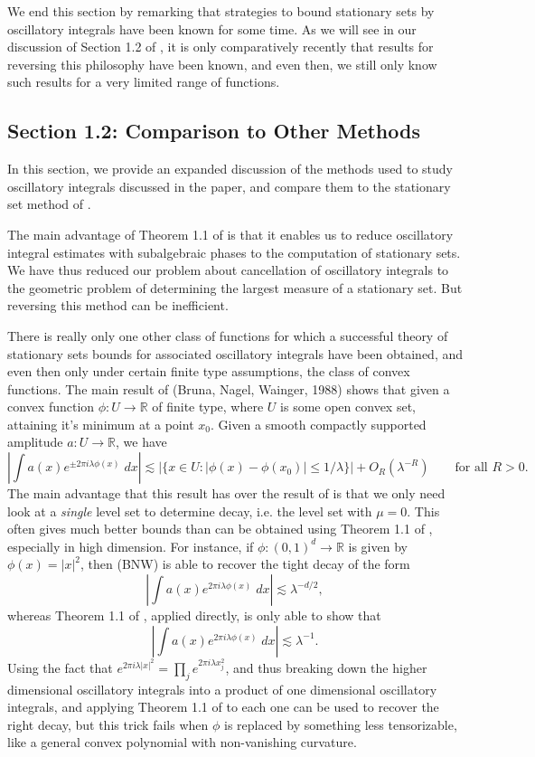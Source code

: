 \documentclass[12pt]{article}
\newcommand{\R}{\mathbb{R}}
\theoremstyle{definition}
\theoremstyle{remark}
\numberwithin{equation}{section}
\begin{document}
We end this section by remarking that strategies to bound stationary sets by oscillatory integrals have been known for some time. As we will see in our discussion of Section 1.2 of \cite{BGZZ}, it is only comparatively recently that results for reversing this philosophy have been known, and even then, we still only know such results for a very limited range of functions.

\subsection*{Section 1.2: Comparison to Other Methods}

In this section, we provide an expanded discussion of the methods used to study oscillatory integrals discussed in the paper, and compare them to the stationary set method of \cite{BGZZ}.

The main advantage of Theorem 1.1 of \cite{BGZZ} is that it enables us to reduce oscillatory integral estimates with subalgebraic phases to the computation of stationary sets. We have thus reduced our problem about cancellation of oscillatory integrals to the geometric problem of determining the largest measure of a stationary set. But reversing this method can be inefficient. 

There is really only one other class of functions for which a successful theory of stationary sets bounds for associated oscillatory integrals have been obtained, and even then only under certain finite type assumptions, the class of convex functions. The main result of (Bruna, Nagel, Wainger, 1988) shows that given a convex function $\phi: U \to \R$ of finite type, where $U$ is some open convex set, attaining it's minimum at a point $x_0$. Given a smooth compactly supported amplitude $a: U \to \R$, we have
%
\[ \left| \int a(x) e^{\pm 2 \pi i \lambda \phi(x)}\; dx \right| \lesssim |\{ x \in U : |\phi(x) - \phi(x_0)| \leq 1 / \lambda \}| + O_R(\lambda^{-R}) \quad\quad\text{for all $R > 0$}. \]
%
The main advantage that this result has over the result of \cite{BGZZ} is that we only need look at a \emph{single} level set to determine decay, i.e. the level set with $\mu = 0$. This often gives much better bounds than can be obtained using Theorem 1.1 of \cite{BGZZ}, especially in high dimension. For instance, if $\phi: (0,1)^d \to \R$ is given by $\phi(x) = |x|^2$, then (BNW) is able to recover the tight decay of the form
%
\[ \left| \int a(x) e^{2\pi i \lambda \phi(x)}\; dx \right| \lesssim \lambda^{-d/2}, \]
%
whereas Theorem 1.1 of \cite{BGZZ}, applied directly, is only able to show that
%
\[ \left| \int a(x) e^{2 \pi i \lambda \phi(x)}\; dx \right| \lesssim \lambda^{-1}. \]
%
Using the fact that $e^{2 \pi i \lambda |x|^2} = \prod_j e^{2 \pi i \lambda x_j^2}$, and thus breaking down the higher dimensional oscillatory integrals into a product of one dimensional oscillatory integrals, and applying Theorem 1.1 of \cite{BGZZ} to each one can be used to recover the right decay, but this trick fails when $\phi$ is replaced by something less tensorizable, like a general convex polynomial with non-vanishing curvature.
\end{document}
